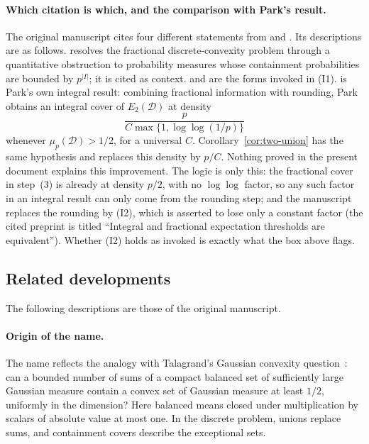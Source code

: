 \documentclass[11pt,letterpaper]{article}
\theoremstyle{definition}
\theoremstyle{remark}
\numberwithin{equation}{section}
\begin{document}
\paragraph{Which citation is which, and the comparison with Park's result.}
The original manuscript cites four different statements from
\cite{Li26} and \cite{Park26}. Its descriptions are as follows.
\cite[Theorem~1.9]{Li26} resolves the fractional discrete-convexity
problem through a quantitative obstruction to probability measures whose
containment probabilities are bounded by $p^{|I|}$; it is cited as
context. \cite[Corollary~3.1]{Li26} and \cite[Theorem~3.4]{Park26} are the
forms invoked in (I1). \cite[Corollary~3.5]{Park26} is Park's own integral
result: combining fractional information with rounding, Park obtains an
integral cover of $E_2(\mathcal D)$ at density
\[
\frac{p}{C\max\{1,\log\log(1/p)\}}
\]
whenever $\mu_p(\mathcal D)>1/2$, for a universal $C$.
Corollary~\ref{cor:two-union} has the same hypothesis and replaces this
density by $p/C$. Nothing proved in the present document explains this
improvement. The logic is only this: the fractional cover in step~(3) is
already at density $p/2$, with no $\log\log$ factor, so any such factor in
an integral result can only come from the rounding step; and the
manuscript replaces the rounding by (I2), which is asserted to lose only a
constant factor (the cited preprint is titled ``Integral and fractional
expectation thresholds are equivalent''). Whether (I2) holds as invoked is
exactly what the box above flags.

\subsection{Related developments}
\label{sec:related}

The following descriptions are those of the original manuscript.

\paragraph{Origin of the name.}
The name reflects the analogy with Talagrand's Gaussian convexity
question~\cite[Conjecture~2.1]{Talagrand10}: can a bounded number of
sums of a compact balanced set of sufficiently large Gaussian measure
contain a convex set of Gaussian measure at least $1/2$, uniformly in
the dimension? Here balanced means closed under multiplication by
scalars of absolute value at most one. In the discrete problem, unions
replace sums, and containment covers describe the exceptional sets.
\end{document}
